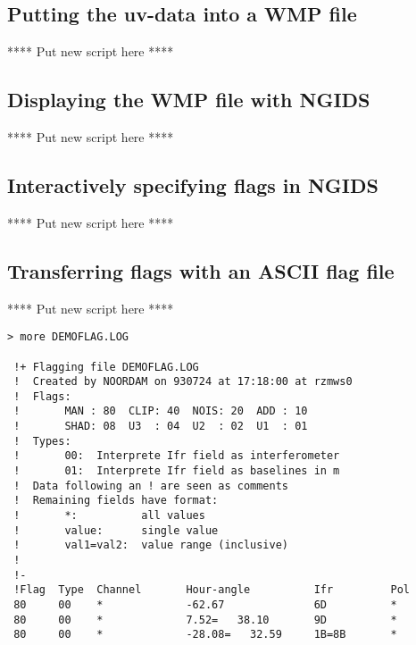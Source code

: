 \subsection{Putting the uv-data into a WMP file}
\label{.interactive.wmp}

**** Put new script here ****


\subsection{Displaying the WMP file with NGIDS}
\label{.interactive.display}

**** Put new script here ****

\subsection{Interactively specifying flags in NGIDS}
\label{.interactive.flag}

**** Put new script here ****

\subsection{Transferring flags with an ASCII flag file}
\label{.interactive.flag.file}

**** Put new script here ****


\begin{verbatim}
> more DEMOFLAG.LOG

 !+ Flagging file DEMOFLAG.LOG
 !  Created by NOORDAM on 930724 at 17:18:00 at rzmws0
 !  Flags:
 !       MAN : 80  CLIP: 40  NOIS: 20  ADD : 10
 !       SHAD: 08  U3  : 04  U2  : 02  U1  : 01
 !  Types:
 !       00:  Interprete Ifr field as interferometer
 !       01:  Interprete Ifr field as baselines in m
 !  Data following an ! are seen as comments
 !  Remaining fields have format:
 !       *:          all values
 !       value:      single value
 !       val1=val2:  value range (inclusive)
 !
 !-
 !Flag  Type  Channel       Hour-angle          Ifr         Pol
 80     00    *             -62.67              6D          *
 80     00    *             7.52=   38.10       9D          *
 80     00    *             -28.08=   32.59     1B=8B       *
\end{verbatim}

